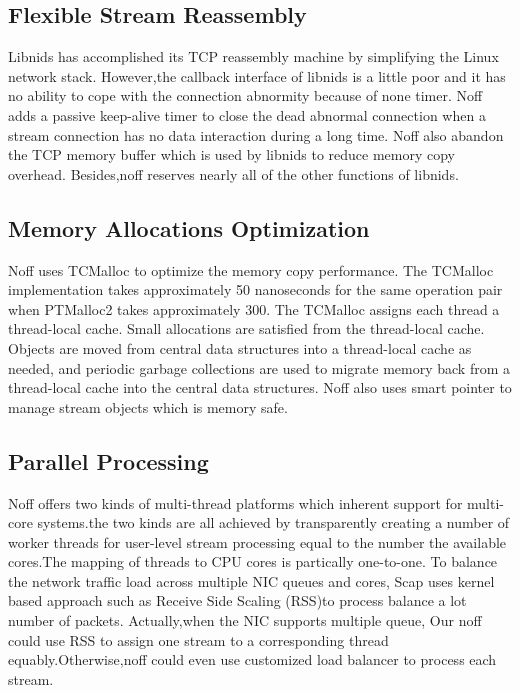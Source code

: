 \documentclass[conference]{IEEEtran}
\begin{document}
\subsection{Flexible Stream Reassembly}
Libnids\cite{IEEE:11} has accomplished its TCP reassembly machine by simplifying the Linux network stack. However,the callback interface of libnids is a little poor and
it has no ability to cope with the connection abnormity because of none timer. Noff adds a passive keep-alive timer to close the dead abnormal connection when
a stream connection has no data interaction during a long time. Noff also abandon the TCP memory buffer which is used by libnids to reduce memory copy overhead. Besides,noff reserves nearly all of the other functions of libnids.

\subsection{Memory Allocations Optimization}
Noff uses TCMalloc\cite{IEEE:7}\cite{IEEE:8} to optimize the memory copy performance. The TCMalloc implementation takes approximately 50 nanoseconds for the same operation pair when PTMalloc2 takes approximately 300.
The TCMalloc assigns each thread a thread-local cache. Small allocations are satisfied from the thread-local cache. 
Objects are moved from central data structures into a thread-local cache as needed, and periodic garbage collections are used to migrate memory back from a thread-local cache into the central data structures. 
\newline\indent Noff also uses smart pointer to manage stream objects which is memory safe.

\subsection{Parallel Processing}
Noff offers two kinds of multi-thread platforms which inherent support for multi-core systems.the two kinds are all achieved by transparently creating a number of worker threads for user-level stream processing equal to the number the available cores.The mapping of threads to CPU cores is partically one-to-one. 
\newline\indent To balance the network traffic load across multiple NIC queues and cores, Scap\cite{IEEE:12} uses kernel based approach such as Receive Side Scaling (RSS)\cite{IEEE:9}to process balance a lot number of packets. Actually,when the NIC supports multiple queue, Our noff could use RSS to assign one stream to a corresponding thread equably.Otherwise,noff could even use customized load balancer to process each stream.
\end{document}
